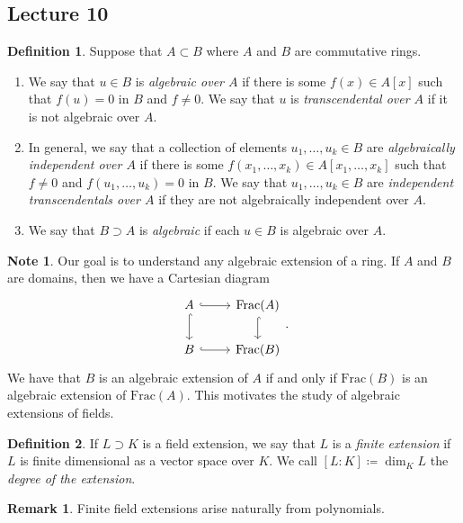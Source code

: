 \documentclass[10pt,letterpaper,cm]{nupset}
\theoremstyle{definition}
\newtheorem*{definition}{Definition}
\newtheorem{note}{Note}
\newtheorem{remark}{Remark}
\newcommand{\1}{\mathbf{1}}
\newcommand{\0}{\vec 0}
\begin{document}
\subsection{Lecture 10}

\begin{definition} Suppose that $A \subset B$ where $A$ and $B$ are commutative rings. 
\begin{enumerate}
\item We say that $u \in B$ is \textit{algebraic over $A$} if there is some $f(x) \in A[x]$ such that $f(u) =0$ in $B$ and $f\ne 0$. We say that $u$ is \textit{transcendental over $A$} if it is not algebraic over $A$. 
\item In general, we say that a collection of elements $u_1, \ldots, u_k \in B$ are \textit{algebraically independent over $A$} if there is some $f(x_1, \ldots, x_k) \in A[x_1, \ldots, x_k]$ such that $f\ne 0$ and $f(u_1, \ldots, u_k) =0$ in $B$. We say that $u_1, \ldots, u_k \in B$ are \textit{independent transcendentals over $A$} if they are not algebraically independent over $A$.
\item We say that $B \supset A$ is \textit{algebraic} if each $u\in B$ is algebraic over $A$.
\end{enumerate}
\end{definition} 

\begin{note}
Our goal is to understand any algebraic extension of a ring. If $A$ and $B$ are domains, then we have a Cartesian diagram 
\[
\begin{tikzcd}
A \arrow[r, hook] \arrow[d, hook] & \text{Frac}(A) \arrow[d, hook] \\
B \arrow[r, hook]                 & \text{Frac}(B)                
\end{tikzcd}
.\] We have that $B$ is an algebraic extension of $A$ if and only if $\text{Frac}(B)$ is an algebraic extension of $\text{Frac}(A)$. This motivates the study of algebraic extensions of fields. 
\end{note}

\begin{definition}
If $L \supset K$ is a field extension, we say that $L$ is a \textit{finite extension} if $L$ is finite dimensional as a vector space over $K$. We call $[L: K]\coloneqq  \dim_K{L}$ the \textit{degree of the extension}.
\end{definition}

\begin{remark}
Finite field extensions arise naturally from polynomials. 
\end{remark}
\end{document}
